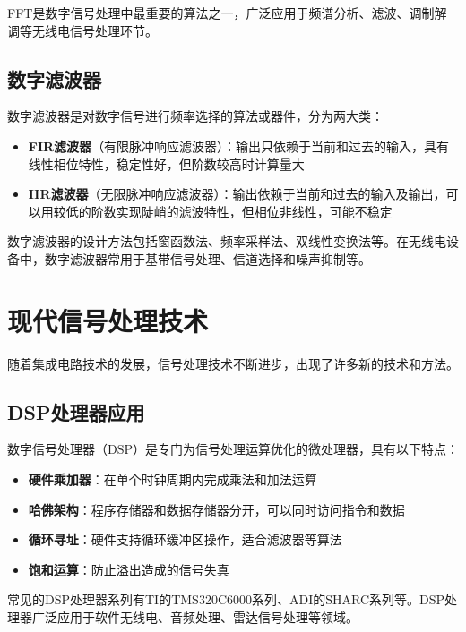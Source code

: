\documentclass[12pt,UTF8]{ctexbook}
\begin{document}
FFT是数字信号处理中最重要的算法之一，广泛应用于频谱分析、滤波、调制解调等无线电信号处理环节。

\subsection{数字滤波器}

数字滤波器是对数字信号进行频率选择的算法或器件，分为两大类：

\begin{itemize}[leftmargin=3.5em]
    \item \textbf{FIR滤波器}（有限脉冲响应滤波器）：输出只依赖于当前和过去的输入，具有线性相位特性，稳定性好，但阶数较高时计算量大
    \item \textbf{IIR滤波器}（无限脉冲响应滤波器）：输出依赖于当前和过去的输入及输出，可以用较低的阶数实现陡峭的滤波特性，但相位非线性，可能不稳定
\end{itemize}

数字滤波器的设计方法包括窗函数法、频率采样法、双线性变换法等。在无线电设备中，数字滤波器常用于基带信号处理、信道选择和噪声抑制等。

\section{现代信号处理技术}

随着集成电路技术的发展，信号处理技术不断进步，出现了许多新的技术和方法。

\subsection{DSP处理器应用}

数字信号处理器（DSP）是专门为信号处理运算优化的微处理器，具有以下特点：

\begin{itemize}[leftmargin=3.5em]
    \item \textbf{硬件乘加器}：在单个时钟周期内完成乘法和加法运算
    \item \textbf{哈佛架构}：程序存储器和数据存储器分开，可以同时访问指令和数据
    \item \textbf{循环寻址}：硬件支持循环缓冲区操作，适合滤波器等算法
    \item \textbf{饱和运算}：防止溢出造成的信号失真
\end{itemize}

常见的DSP处理器系列有TI的TMS320C6000系列、ADI的SHARC系列等。DSP处理器广泛应用于软件无线电、音频处理、雷达信号处理等领域。
\end{document}
